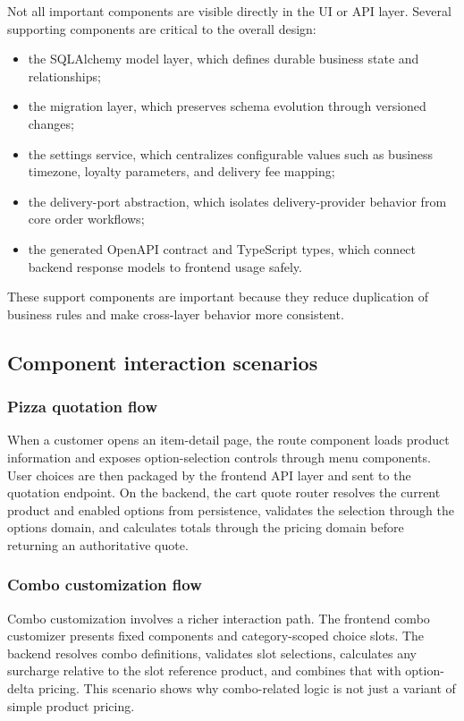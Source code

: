 Not all important components are visible directly in the UI or API layer. Several supporting components are critical to the overall design:

\begin{itemize}
    \item the SQLAlchemy model layer, which defines durable business state and relationships;
    \item the migration layer, which preserves schema evolution through versioned changes;
    \item the settings service, which centralizes configurable values such as business timezone, loyalty parameters, and delivery fee mapping;
    \item the delivery-port abstraction, which isolates delivery-provider behavior from core order workflows;
    \item the generated OpenAPI contract and TypeScript types, which connect backend response models to frontend usage safely.
\end{itemize}

These support components are important because they reduce duplication of business rules and make cross-layer behavior more consistent.

\subsection{Component interaction scenarios}

\subsubsection{Pizza quotation flow}

When a customer opens an item-detail page, the route component loads product information and exposes option-selection controls through menu components. User choices are then packaged by the frontend API layer and sent to the quotation endpoint. On the backend, the cart quote router resolves the current product and enabled options from persistence, validates the selection through the options domain, and calculates totals through the pricing domain before returning an authoritative quote.

\subsubsection{Combo customization flow}

Combo customization involves a richer interaction path. The frontend combo customizer presents fixed components and category-scoped choice slots. The backend resolves combo definitions, validates slot selections, calculates any surcharge relative to the slot reference product, and combines that with option-delta pricing. This scenario shows why combo-related logic is not just a variant of simple product pricing.


